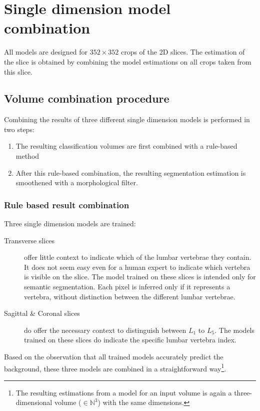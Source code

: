 

\chapter{Single dimension model combination\label{sec:combination}}

All models are designed for $352 \times 352$ crops of the 2D slices.
The estimation of the slice is obtained by combining the model estimations on all crops taken from this slice.

\section{Volume combination procedure}

Combining the results of three different single dimension models is performed in two steps:
\begin{enumerate}
    \item The resulting classification volumes are first combined with a rule-based method
    \item After this rule-based combination, the resulting segmentation estimation is smoothened with a morphological filter.
\end{enumerate}

\subsection{Rule based result combination}
Three single dimension models are trained:
\begin{description}
    \item[Transverse slices] offer little context to indicate which of the lumbar vertebrae they contain. 
    It does not seem easy even for a human expert to indicate which vertebra is visible on the slice.
    The model trained on these slices is intended only for semantic segmentation.
    Each pixel is inferred only if it represents a vertebra, without distinction between the different lumbar vertebrae. 
    \item[Sagittal \& Coronal slices] do offer the necessary context to distinguish between $L_1$ to $L_5$. 
    The models trained on these slices do indicate the specific lumbar vertebra index. 
\end{description}

Based on the observation that all trained models accurately predict the background, these three models are combined in a straightforward way\footnote{
    The resulting estimations from a model for an input volume is again a three-dimensional volume ($\in \mathbb{N}^3$) with the same dimensions.
}.

